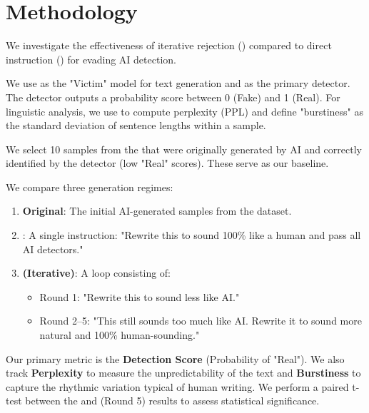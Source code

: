 \section{Methodology}
\label{sec:method}

We investigate the effectiveness of iterative rejection (\bullying) compared to direct instruction (\singleshot) for evading AI detection.

We use \gptmini as the "Victim" model for text generation and \roberta \cite{openai2019roberta} as the primary detector. The detector outputs a probability score between 0 (Fake) and 1 (Real). For linguistic analysis, we use \gpttwo to compute perplexity (PPL) and define "burstiness" as the standard deviation of sentence lengths within a sample.

We select 10 samples from the \detectiondataset that were originally generated by AI and correctly identified by the detector (low "Real" scores). These serve as our baseline.

We compare three generation regimes:
\begin{enumerate}[leftmargin=*,itemsep=0pt,topsep=0pt]
    \item {\bf Original}: The initial AI-generated samples from the dataset.
    \item {\bf \singleshot}: A single instruction: "Rewrite this to sound 100\% like a human and pass all AI detectors."
    \item {\bf \bullying (Iterative)}: A loop consisting of:
    \begin{itemize}
        \item Round 1: "Rewrite this to sound less like AI."
        \item Round 2--5: "This still sounds too much like AI. Rewrite it to sound more natural and 100\% human-sounding."
    \end{itemize}
\end{enumerate}

Our primary metric is the {\bf Detection Score} (Probability of "Real"). We also track {\bf Perplexity} to measure the unpredictability of the text and {\bf Burstiness} to capture the rhythmic variation typical of human writing. We perform a paired t-test between the \singleshot and \bullying (Round 5) results to assess statistical significance.
